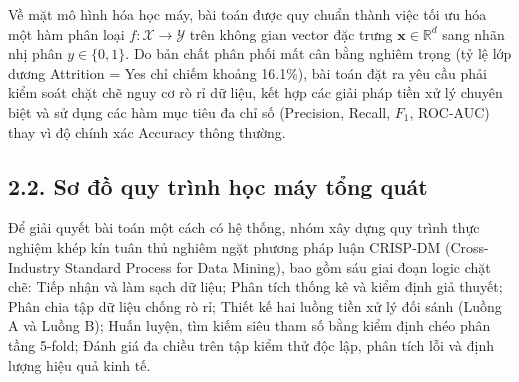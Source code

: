 \documentclass[12pt,a4paper]{article}
\begin{document}
Về mặt mô hình hóa học máy, bài toán được quy chuẩn thành việc tối ưu hóa một hàm phân loại $f: \mathcal{X} \to \mathcal{Y}$ trên không gian vector đặc trưng $\mathbf{x} \in \mathbb{R}^d$ sang nhãn nhị phân $y \in \{0, 1\}$. Do bản chất phân phối mất cân bằng nghiêm trọng (tỷ lệ lớp dương Attrition = Yes chỉ chiếm khoảng 16.1\%), bài toán đặt ra yêu cầu phải kiểm soát chặt chẽ nguy cơ rò rỉ dữ liệu, kết hợp các giải pháp tiền xử lý chuyên biệt và sử dụng các hàm mục tiêu đa chỉ số (Precision, Recall, $F_1$, ROC-AUC) thay vì độ chính xác Accuracy thông thường.

\subsection{2.2. Sơ đồ quy trình học máy tổng quát}
Để giải quyết bài toán một cách có hệ thống, nhóm xây dựng quy trình thực nghiệm khép kín tuân thủ nghiêm ngặt phương pháp luận CRISP-DM (Cross-Industry Standard Process for Data Mining), bao gồm sáu giai đoạn logic chặt chẽ: Tiếp nhận và làm sạch dữ liệu; Phân tích thống kê và kiểm định giả thuyết; Phân chia tập dữ liệu chống rò rỉ; Thiết kế hai luồng tiền xử lý đối sánh (Luồng A và Luồng B); Huấn luyện, tìm kiếm siêu tham số bằng kiểm định chéo phân tầng 5-fold; Đánh giá đa chiều trên tập kiểm thử độc lập, phân tích lỗi và định lượng hiệu quả kinh tế.
\end{document}
